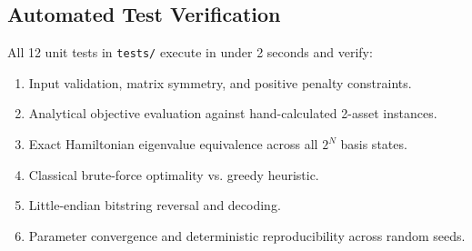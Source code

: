 \subsection{Automated Test Verification}
All 12 unit tests in \texttt{tests/} execute in under 2 seconds and verify:
\begin{enumerate}
    \item Input validation, matrix symmetry, and positive penalty constraints.
    \item Analytical objective evaluation against hand-calculated 2-asset instances.
    \item Exact Hamiltonian eigenvalue equivalence across all $2^N$ basis states.
    \item Classical brute-force optimality vs. greedy heuristic.
    \item Little-endian bitstring reversal and decoding.
    \item Parameter convergence and deterministic reproducibility across random seeds.
\end{enumerate}
